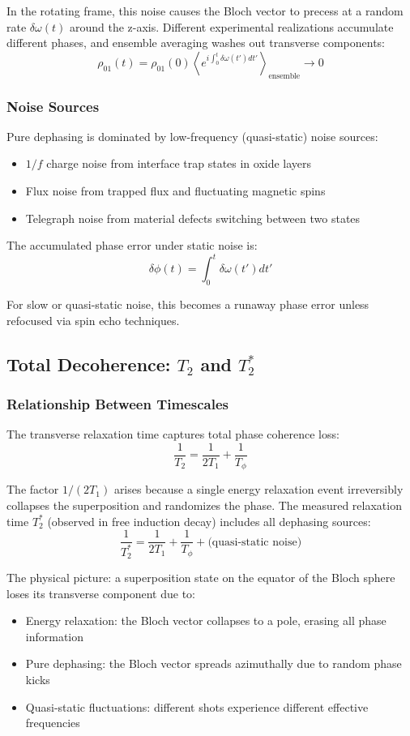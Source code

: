 \documentclass{article}
\begin{document}
In the rotating frame, this noise causes the Bloch vector to precess at a random rate $\delta\omega(t)$ around the z-axis. Different experimental realizations accumulate different phases, and ensemble averaging washes out transverse components:
$$\rho_{01}(t) = \rho_{01}(0) \left\langle e^{i\int_0^t \delta\omega(t')dt'} \right\rangle_{\text{ensemble}} \to 0$$

\subsubsection*{Noise Sources}

Pure dephasing is dominated by low-frequency (quasi-static) noise sources:
\begin{itemize}
    \item $1/f$ charge noise from interface trap states in oxide layers
    \item Flux noise from trapped flux and fluctuating magnetic spins
    \item Telegraph noise from material defects switching between two states
\end{itemize}

The accumulated phase error under static noise is:
$$\delta\phi(t) = \int_0^t \delta\omega(t') dt'$$

For slow or quasi-static noise, this becomes a runaway phase error unless refocused via spin echo techniques.

\subsection{Total Decoherence: $T_2$ and $T_2^*$}

\subsubsection*{Relationship Between Timescales}

The transverse relaxation time captures total phase coherence loss:
$$\frac{1}{T_2} = \frac{1}{2T_1} + \frac{1}{T_\phi}$$

The factor $1/(2T_1)$ arises because a single energy relaxation event irreversibly collapses the superposition and randomizes the phase. The measured relaxation time $T_2^*$ (observed in free induction decay) includes all dephasing sources:
$$\frac{1}{T_2^*} = \frac{1}{2T_1} + \frac{1}{T_\phi} + \text{(quasi-static noise)}$$

The physical picture: a superposition state on the equator of the Bloch sphere loses its transverse component due to:
\begin{itemize}
    \item Energy relaxation: the Bloch vector collapses to a pole, erasing all phase information
    \item Pure dephasing: the Bloch vector spreads azimuthally due to random phase kicks
    \item Quasi-static fluctuations: different shots experience different effective frequencies
\end{itemize}
\end{document}
